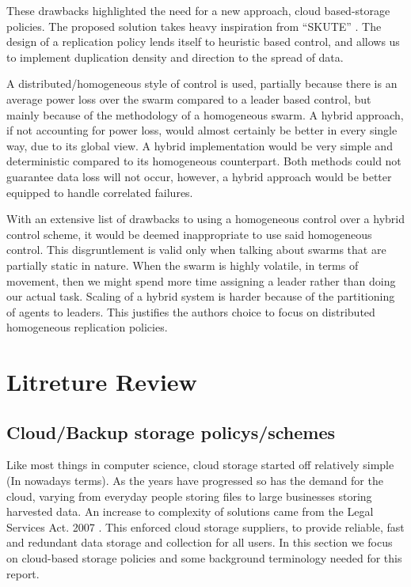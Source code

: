 \documentclass{UoYCSproject}
\begin{document}
These drawbacks highlighted the need for a new approach, cloud based-storage policies. The proposed solution takes heavy inspiration from “SKUTE” \cite{Distributed Storage}. The design of a replication policy lends itself to heuristic based control, and allows us to implement duplication density and direction to the spread of data.

A distributed/homogeneous style of control is used, partially because there is an average power loss over the swarm compared to a leader based control, but mainly because of the methodology of a homogeneous swarm. A hybrid approach, if not accounting for power loss, would almost certainly be better in every single way, due to its global view. A hybrid implementation would be very simple and deterministic compared to its homogeneous counterpart. Both methods could not guarantee data loss will not occur, however, a hybrid approach would be better equipped to handle correlated failures.

With an extensive list of drawbacks to using a homogeneous control over a hybrid control scheme, it would be deemed inappropriate to use said homogeneous control. This disgruntlement is valid only when talking about swarms that are partially static in nature. When the swarm is highly volatile, in terms of movement, then we might spend more time assigning a leader rather than doing our actual task. Scaling of a hybrid system is harder because of the partitioning of agents to leaders. This justifies the authors choice to focus on distributed homogeneous replication policies.

\chapter{Litreture Review}
\label{cha:Litreture Review}

\section{Cloud/Backup storage policys/schemes}
\label{sec:Cloud}

Like most things in computer science, cloud storage started off relatively simple (In nowadays terms).
As the years have progressed so has the demand for the cloud, varying from everyday people storing files to large businesses storing harvested data.
An increase to complexity of solutions came from the Legal Services Act. 2007 \cite{LSA}.
This enforced cloud storage suppliers, to provide reliable, fast and redundant data storage and collection for all users.
In this section we focus on cloud-based storage policies and some background terminology needed for this report.
\end{document}

